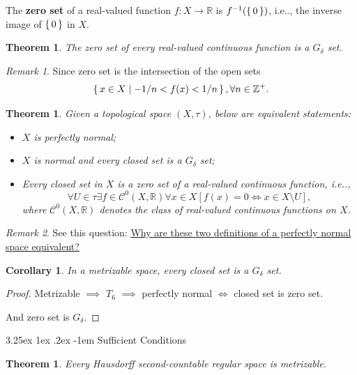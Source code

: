 \documentclass[12pt, letterpaper]{article}
\makeatletter
\renewcommand\subparagraph{\@startsection{subparagraph}{5}{\parindent}%
	{3.25ex \@plus1ex \@minus .2ex}%
	{0.75ex plus 0.1ex}%
	{\normalfont\normalsize\bfseries}}
\newcommand{\inte}{\mathbb{Z}}
\newcommand{\re}{\mathbb{R}}
\newcommand\ie{i.e\@ifnextchar.{}{.\@}}
\newtheorem{cor}[prop]{Corollary}
\newtheorem{thm}[prop]{Theorem}
\renewcommand\subparagraph{\@startsection{subparagraph}{5}{\parindent}%
	{3.25ex \@plus1ex \@minus .2ex}%
	{-1em}%
	{\normalfont\normalsize\bfseries}}
\theoremstyle{definition}
\theoremstyle{remark}
\newtheorem*{rem*}{Remark}
\theoremstyle{definition}
\theoremstyle{plain}
\numberwithin{equation}{section}
\makeatother
\begin{document}
	\begin{def*}
		The \textbf{zero set} of a real-valued function $f\colon X\to\re$ is $f^{-1}(\set{0})$,
	\ie, the inverse image of $\set{0}$ in $X$.
	\end{def*}
	\begin{thm}
		The zero set of every real-valued continuous function is a $G_\delta$ set.
	\end{thm}
	\begin{rem*}
		Since zero set is the intersection of the open sets 
		\[ \set{x\in X|-1/n<f(x)<1/n},\forall n\in \inte^+.\]
	\end{rem*}

	\begin{thm}\label{thmPerfectlyNormal}
		Given a topological space $(X,\tau)$, below are equivalent statements:
		\begin{itemize}
			\item $X$ is perfectly normal;
			\item $X$ is normal and every closed set is a $G_\delta$ set;
			\item Every closed set in $X$ is a zero set of a real-valued continuous function, \ie,
			\[\forall U\in\tau \exists f\in \mathcal{C}^0(X,\re)\forall x\in X[ f(x)=0\iff x\in X\setminus U ], \] 
			where $\mathcal{C}^0(X,\re)$ denotes the class of real-valued continuous functions on $X$.
		\end{itemize}
	\end{thm}
	\begin{rem*}
		See this question:
		\href{https://math.stackexchange.com/questions/72138/why-are-these-two-definitions-of-a-perfectly-normal-space-equivalent}
		{Why are these two definitions of a perfectly normal space equivalent?}
	\end{rem*}

	\begin{cor}
		In a metrizable space, every closed set is a $G_\delta$ set.
	\end{cor}
	\begin{proof}
		Metrizable $\implies$ $T_6$ $\implies$ perfectly normal $\iff$ closed set is zero set.
		
		And zero set is $G_\delta$.
	\end{proof}
	
	
	
	
	
	
	

	\subparagraph{Sufficient Conditions}
	
	\begin{thm}
		Every Hausdorff second-countable regular space is metrizable.
	\end{thm}
	
\end{document}
